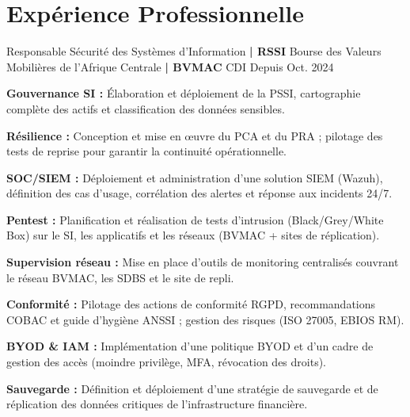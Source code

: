 \section{Expérience Professionnelle}


\cventry
{Responsable Sécurité des Systèmes d'Information \textbf{| RSSI}} %
{Bourse des Valeurs Mobilières de l'Afrique Centrale \textbf{| BVMAC}} %
{CDI} %
{Depuis Oct. 2024} %
\begin{cvitems}
\item {\textbf{Gouvernance SI :} Élaboration et déploiement de la PSSI, cartographie complète des actifs et classification des données sensibles.}
\item {\textbf{Résilience :} Conception et mise en œuvre du PCA et du PRA ; pilotage des tests de reprise pour garantir la continuité opérationnelle.}
\item {\textbf{SOC/SIEM :} Déploiement et administration d'une solution SIEM (Wazuh), définition des cas d'usage, corrélation des alertes et réponse aux incidents 24/7.}
\item {\textbf{Pentest :} Planification et réalisation de tests d'intrusion (Black/Grey/White Box) sur le SI, les applicatifs et les réseaux (BVMAC + sites de réplication).}
\item {\textbf{Supervision réseau :} Mise en place d'outils de monitoring centralisés couvrant le réseau BVMAC, les SDBS et le site de repli.}
\item {\textbf{Conformité :} Pilotage des actions de conformité RGPD, recommandations COBAC et guide d'hygiène ANSSI ; gestion des risques (ISO 27005, EBIOS RM).}
\item {\textbf{BYOD \& IAM :} Implémentation d'une politique BYOD et d'un cadre de gestion des accès (moindre privilège, MFA, révocation des droits).}
\item {\textbf{Sauvegarde :} Définition et déploiement d'une stratégie de sauvegarde et de réplication des données critiques de l'infrastructure financière.}
\end{cvitems}


